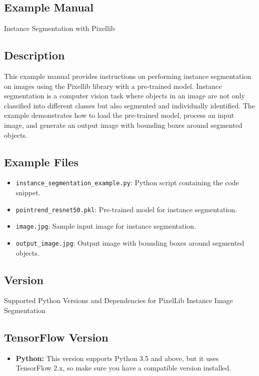 \subsection{Example Manual}
Instance Segmentation with Pixellib

\subsection{Description}
This example manual provides instructions on performing instance segmentation on images using the Pixellib library with a pre-trained model. Instance segmentation is a computer vision task where objects in an image are not only classified into different classes but also segmented and individually identified. The example demonstrates how to load the pre-trained model, process an input image, and generate an output image with bounding boxes around segmented objects.

\subsection{Example Files}
\begin{itemize}
    \item \texttt{instance\_segmentation\_example.py}: Python script containing the code snippet.
    \item \texttt{pointrend\_resnet50.pkl}: Pre-trained model for instance segmentation.
    \item \texttt{image.jpg}: Sample input image for instance segmentation.
    \item \texttt{output\_image.jpg}: Output image with bounding boxes around segmented objects.
\end{itemize}

\subsection{Version}
Supported Python Versions and Dependencies for PixelLib Instance Image Segmentation

\subsection*{TensorFlow Version}
\begin{itemize}[label=--]
    \item \textbf{Python:} This version supports Python 3.5 and above, but it uses TensorFlow 2.x, so make sure you have a compatible version installed.
\end{itemize}


